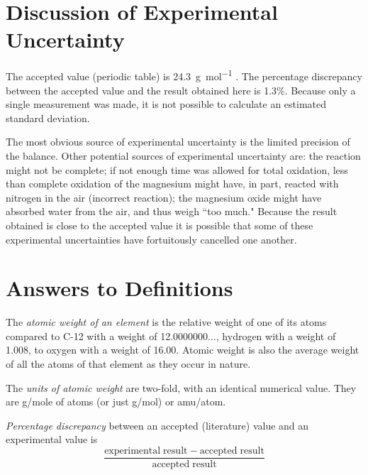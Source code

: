 \documentclass{article}
\begin{document}

\section{Discussion of Experimental Uncertainty}

The accepted value (periodic table) is \SI{24.3}{\gram\per\mole} \cite{Smith:2012qr}. The percentage discrepancy between the accepted value and the result obtained here is 1.3\%. Because only a single measurement was made, it is not possible to calculate an estimated standard deviation.

The most obvious source of experimental uncertainty is the limited precision of the balance. Other potential sources of experimental uncertainty are: the reaction might not be complete; if not enough time was allowed for total oxidation, less than complete oxidation of the magnesium might have, in part, reacted with nitrogen in the air (incorrect reaction); the magnesium oxide might have absorbed water from the air, and thus weigh ``too much." Because the result obtained is close to the accepted value it is possible that some of these experimental uncertainties have fortuitously cancelled one another.


\section{Answers to Definitions}

\begin{enumerate}
\begin{item}
The \emph{atomic weight of an element} is the relative weight of one of its atoms compared to C-12 with a weight of 12.0000000$\ldots$, hydrogen with a weight of 1.008, to oxygen with a weight of 16.00. Atomic weight is also the average weight of all the atoms of that element as they occur in nature.
\end{item}
\begin{item}
The \emph{units of atomic weight} are two-fold, with an identical numerical value. They are g/mole of atoms (or just g/mol) or amu/atom.
\end{item}
\begin{item}
\emph{Percentage discrepancy} between an accepted (literature) value and an experimental value is
\begin{equation*}
\frac{\mathrm{experimental\;result} - \mathrm{accepted\;result}}{\mathrm{accepted\;result}}
\end{equation*}
\end{item}
\end{enumerate}
\end{document}
